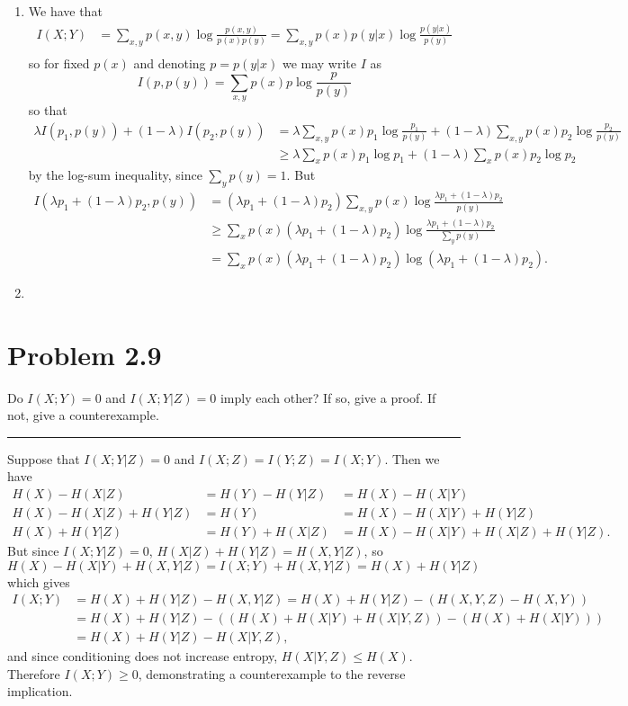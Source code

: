 \documentclass{article}
\newcommand{\horline}
           {\begin{center}
              \noindent\rule{8cm}{0.4pt}
            \end{center}}
\begin{document}
\begin{enumerate}[label=\alph*)]
  \item{We have that
       \begin{align*}
         I(X ; Y) &= \sum_{x,y} p(x,y) \log \frac{p(x,y)}{p(x)p(y)}
                   = \sum_{x,y} p(x) p(y|x) \log \frac{p(y|x)}{p(y)} \\
       \end{align*}
       so for fixed $p(x)$ and denoting $p = p(y|x)$ we may write $I$ as
       $$
       I(p, p(y)) = \sum_{x,y} p(x) p \log \frac{p}{p(y)} 
       $$
       so that
       \begin{align*}
       \lambda I(p_1, p(y)) + (1 - \lambda) I(p_2, p(y)) & = 
           \lambda \sum_{x,y} p(x) p_1 \log \frac{p_1}{p(y)} 
         + (1 - \lambda) \sum_{x,y} p(x) p_2 \log \frac{p_2}{p(y)} \\
        & \geq \lambda \sum_x p(x) p_1 \log p_1 
             + (1 - \lambda) \sum_x p(x) p_2 \log p_2
       \end{align*}
       by the log-sum inequality, since $\sum_y p(y) = 1$. But
       \begin{align*}
       I(\lambda p_1 + (1 - \lambda) p_2, p(y)) & = 
         (\lambda p_1 + (1-\lambda)p_2) \sum_{x,y} p(x) 
            \log \frac{\lambda p_1 + (1-\lambda)p_2}{p(y)} \\
        &\geq \sum_{x} p(x) (\lambda p_1+(1-\lambda)p_2) 
             \log \frac{\lambda p_1+(1-\lambda)p_2}{\sum_y p(y)} \\
        &=\sum_x p(x)(\lambda p_1+(1-\lambda)p_2)
          \log(\lambda p_1+(1-\lambda)p_2).
       \end{align*}
       }
  \item{
       }
\end{enumerate}

\section*{Problem 2.9}
Do $I(X;Y) = 0$ and $I(X; Y|Z) = 0$ imply each other? If so, give a proof.
If not, give a counterexample.
\horline
Suppose that $I(X;Y|Z) = 0$ and $I(X;Z) = I(Y;Z) = I(X;Y)$.
Then we have
\begin{align*}
H(X) - H(X|Z) &= H(Y) - H(Y|Z) &= H(X) - H(X|Y) \\
H(X) - H(X|Z) + H(Y|Z) &= H(Y) &= H(X) - H(X|Y) + H(Y|Z) \\
H(X) + H(Y|Z) &= H(Y) + H(X|Z) &= H(X) - H(X|Y) + H(X|Z) + H(Y|Z).
\end{align*}
But since $I(X;Y|Z) = 0$, $H(X|Z) + H(Y|Z) = H(X,Y|Z)$, so
$$
H(X) - H(X|Y) + H(X,Y|Z) = I(X;Y) + H(X, Y|Z) = H(X) + H(Y|Z)
$$
which gives
\begin{align*}
I(X; Y) &= H(X) + H(Y|Z) - H(X,Y|Z) = H(X) + H(Y|Z) - (H(X,Y,Z)-H(X,Y))\\
        &= H(X)+H(Y|Z) - ((H(X)+H(X|Y)+H(X|Y,Z))-(H(X)+H(X|Y))) \\ 
        &= H(X)+H(Y|Z) - H(X|Y,Z),
\end{align*}
and since conditioning does not increase entropy, $H(X|Y,Z) \leq H(X)$. 
Therefore $I(X;Y) \geq 0$, demonstrating a counterexample to the reverse
implication.
\end{document}
